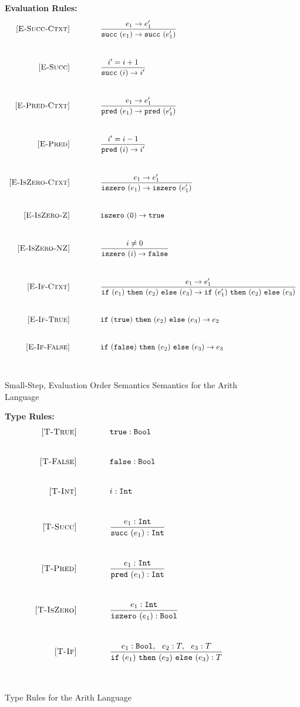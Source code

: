 \documentclass{report}
\newcommand{\rel}[1]{ \mbox{\sc [#1]} }
\begin{document}
\newcommand{\ruleNoBar}[2]{
  \rel{#1} &
     \strut\begin{array}{@{}c@{}} #2 \end{array}
   \\~\\~\\
}
\newcommand{\ruleWithBar}[3]{
  \rel{#1} &
  \frac{\strut\begin{array}{@{}c@{}} #2 \end{array}}
       {\strut\begin{array}{@{}c@{}} #3 \end{array}}
   \\~\\~\\
}
\newcommand{\sstep}[2]{{#1} \rightarrow {#2}}
\newcommand{\typeRule}[2]{{#1} : {#2}}


\begin{figure}[H]
{\bf Evaluation Rules:~~~ \fbox{$\sstep{e}{e'}$}} \\
\[
\begin{array}{r@{\qquad\qquad}l}
\ruleWithBar{E-Succ-Ctxt}{
  \sstep{e_1}{e'_1}
}{
  \sstep{\succe {e_1}}{\succe {e'_1}}
}
\ruleWithBar{E-Succ}{
  i' = i + 1
}{
  \sstep{\succe i}{i'}
}
\ruleWithBar{E-Pred-Ctxt}{
  \sstep{e_1}{e'_1}
}{
  \sstep{\prede {e_1}}{\prede {e'_1}}
}
\ruleWithBar{E-Pred}{
  i' = i - 1
}{
  \sstep{\prede i}{i'}
}
\ruleWithBar{E-IsZero-Ctxt}{
  \sstep{e_1}{e'_1}
}{
  \sstep{\iszeroe {e_1}}{\iszeroe {e_1'}}
}
\ruleNoBar{E-IsZero-Z}{
  \sstep{\iszeroe \zero}{\true}
}
\ruleWithBar{E-IsZero-NZ}{
   i \ne 0
}{
  \sstep{\iszeroe i}{\false}
}
\ruleWithBar{E-If-Ctxt}{
  \sstep{e_1}{e'_1}
}{
  \sstep{\ife {e_1} {e_2} {e_3}}{\ife {e'_1} {e_2} {e_3}}
}
\ruleNoBar{E-If-True}{
  \sstep{\ife \true {e_2} {e_3}}{e_2}
}
\ruleNoBar{E-If-False}{
  \sstep{\ife \false {e_2} {e_3}}{e_3}
}
\end{array}
\]
\caption{Small-Step, Evaluation Order Semantics Semantics for the Arith Language}\label{fig:arithSmallStepRules}
\end{figure}

\begin{figure}[H]
{\bf Type Rules:~~~ \fbox{$\typeRule{e}{T}$}} \\
\[
\begin{array}{r@{\qquad\qquad}l}
\ruleNoBar{T-True}{
  \typeRule{\true}{\boolt}
}
\ruleNoBar{T-False}{
  \typeRule{\false}{\boolt}
}
\ruleNoBar{T-Int}{
  \typeRule{i}{\intt}
}
\ruleWithBar{T-Succ}{
  \typeRule{e_1}{\intt}
}{
  \typeRule{\succe {e_1}}{\intt}
}
\ruleWithBar{T-Pred}{
  \typeRule{e_1}{\intt}
}{
  \typeRule{\prede {e_1}}{\intt}
}
\ruleWithBar{T-IsZero}{
  \typeRule{e_1}{\intt}
}{
  \typeRule{\iszeroe {e_1}}{\boolt}
}
\ruleWithBar{T-If}{
  \typeRule{e_1}{\boolt},~~\typeRule{e_2}{T},~~\typeRule{e_3}{T}
}{
  \typeRule{\ife {e_1} {e_2} {e_3}}{T}
}
\end{array}
\]
\caption{Type Rules for the Arith Language}\label{fig:arithTypeRules}
\end{figure}
\end{document}
